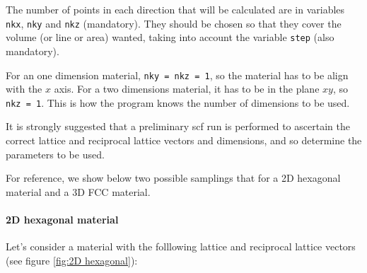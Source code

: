 \documentclass[a4paper,12pt]{report}
\begin{document}
 The number of points in each direction that will be calculated are in variables
 \verb|nkx|, \verb|nky| and \verb|nkz| (mandatory).
 They should be chosen so that they cover the volume (or line or area) wanted,
 taking into account the variable \verb|step| (also mandatory).

 For an one dimension material, \verb|nky = nkz = 1|, so the material has to be align with the $x$ axis.
 For a two dimensions material, it has to be in the plane $xy$, so \verb|nkz = 1|.
 This is how the program knows the number of dimensions to be used.

 It is strongly suggested that a preliminary scf run is performed to ascertain the correct
 lattice and reciprocal lattice vectors and dimensions,
 and so determine the parameters to be used.

 For reference, we show below two possible samplings that for a 2D hexagonal material
 and a 3D FCC material.

 \paragraph{2D hexagonal material}

 Let's consider a material with the folllowing lattice and reciprocal lattice vectors
 (see figure \ref{fig:2D hexagonal}):
\medskip
\end{document}
